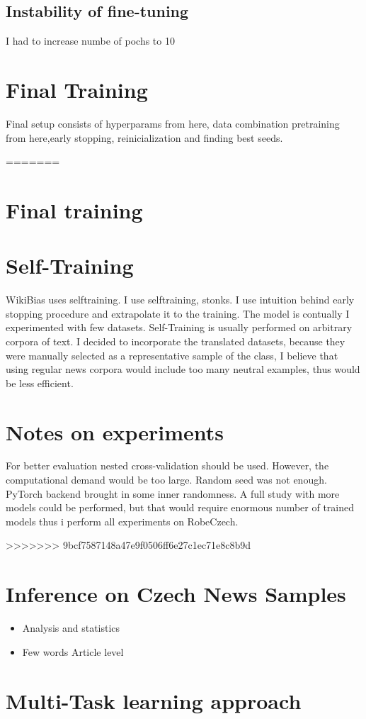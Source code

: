 \subsection{Instability of fine-tuning}
I had to increase numbe of pochs to 10
\section{Final Training}
Final setup consists of hyperparams from here, data combination pretraining from here,early stopping, reinicialization and finding best seeds.
 
 
 
=======
 
 
\section{Final training}
 
\section{Self-Training}
WikiBias uses selftraining. I use selftraining, stonks.
I use intuition behind early stopping procedure and extrapolate it to the training. The model is contually 
I experimented with few datasets. Self-Training is usually performed on arbitrary corpora of text. I decided to incorporate the translated datasets, because they were manually selected as a representative sample of the class, I believe that using regular news corpora would include too many neutral examples, thus would be less efficient.



\section{Notes on experiments}

For better evaluation nested cross-validation should be used. However, the computational demand would be too large. Random seed was not enough. PyTorch backend brought in some inner randomness.
  A full study with more models could be performed, but that would require enormous number of trained models thus i perform all experiments on RobeCzech.
  
  

>>>>>>> 9bcf7587148a47e9f0506ff6e27c1ec71e8c8b9d
\section{Inference on Czech News Samples}
\begin{itemize}
    \item Analysis and statistics
    \item Few words Article level
\end{itemize}


\section{Multi-Task learning approach}\label{mtl}
